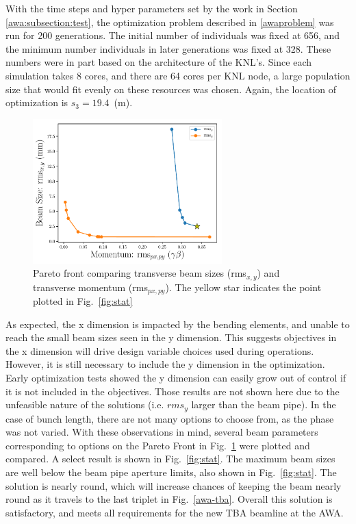 With the time steps and hyper parameters set by the work in Section \ref{awa:subsection:test}, 
the optimization problem described in \ref{awaproblem} was run for 200 generations.
The initial number of individuals was fixed at 656, 
and the minimum number individuals in later generations was fixed at 328. 
These numbers were in part based on the architecture of the KNL's. 
Since each simulation takes 8 cores, and there are 64 cores per KNL node, 
a large population size that would fit evenly on these resources was chosen. 
Again, the location of optimization is $s_3=19.4$~(m). 
\begin{figure}
	\begin{center}		
		\includegraphics[width=0.65\textwidth]{paperedit_pareto_front_Q5_xy_vs_pxpy}
	\end{center} 
		\caption{Pareto front comparing transverse beam sizes (rms$_{x,y}$) and transverse momentum (rms$_{px,py}$). The yellow star indicates the 
		point plotted in Fig.~\ref{fig:stat}}
	\label{fig:pareto1}
\end{figure}
 
As expected, the x dimension is impacted by the bending elements, and unable to reach 
the small beam sizes seen in the y dimension. This suggests objectives in the x 
dimension will drive design variable choices used during operations. 
However, it is still necessary to 
include the y dimension in the optimization. Early optimization tests showed the y dimension 
can easily grow out of control if it is not included in the objectives.
Those results are not shown here due to the unfeasible nature of the solutions 
(i.e. $rms_y$ larger than the beam pipe).
In the case of bunch length, there are not many options to choose from, as the phase was not varied.
With these observations in mind, several beam parameters corresponding to
options on the Pareto Front in Fig.~\ref{fig:pareto1} were plotted and compared. 
A select result is shown in Fig.~\ref{fig:stat}.  
The maximum beam sizes are well below the beam pipe aperture limits, also shown in Fig.~\ref{fig:stat}.
The solution is nearly round, which will increase chances of keeping the beam nearly round
as it travels to the last triplet in Fig.~\ref{awa-tba}.
Overall this solution is satisfactory, and meets all requirements for the new TBA beamline at the AWA.

